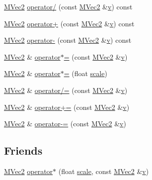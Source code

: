 \begin{CompactItemize}
\item 
\hyperlink{class_m_vec2}{MVec2} \hyperlink{class_m_vec2_a0a8d73a0d2df28d54330b8b8709499b}{operator/} (const \hyperlink{class_m_vec2}{MVec2} \&\hyperlink{glext__bak_8h_5cf89b94f7478c0ebc4429b60e7ef93b}{v}) const 
\item 
\hyperlink{class_m_vec2}{MVec2} \hyperlink{class_m_vec2_bb82987dba0a4e140357d3d04c1f9770}{operator+} (const \hyperlink{class_m_vec2}{MVec2} \&\hyperlink{glext__bak_8h_5cf89b94f7478c0ebc4429b60e7ef93b}{v}) const 
\item 
\hyperlink{class_m_vec2}{MVec2} \hyperlink{class_m_vec2_3ebc8a2ec5fddfb03ae70b8b5eba372e}{operator-} (const \hyperlink{class_m_vec2}{MVec2} \&\hyperlink{glext__bak_8h_5cf89b94f7478c0ebc4429b60e7ef93b}{v}) const 
\item 
\hyperlink{class_m_vec2}{MVec2} \& \hyperlink{class_m_vec2_323651a51ffe6608ba52368916c691c8}{operator$\ast$=} (const \hyperlink{class_m_vec2}{MVec2} \&\hyperlink{glext__bak_8h_5cf89b94f7478c0ebc4429b60e7ef93b}{v})
\item 
\hyperlink{class_m_vec2}{MVec2} \& \hyperlink{class_m_vec2_70d977f70e6f277fd2a918a90f803d0b}{operator$\ast$=} (float \hyperlink{glext__bak_8h_281421b881aa7a1266842b73a3bc7655}{scale})
\item 
\hyperlink{class_m_vec2}{MVec2} \& \hyperlink{class_m_vec2_8d7dfb8881c4acce91b1143471f0abce}{operator/=} (const \hyperlink{class_m_vec2}{MVec2} \&\hyperlink{glext__bak_8h_5cf89b94f7478c0ebc4429b60e7ef93b}{v})
\item 
\hyperlink{class_m_vec2}{MVec2} \& \hyperlink{class_m_vec2_843631a6f52ac62d6e8af05acb26ffc2}{operator+=} (const \hyperlink{class_m_vec2}{MVec2} \&\hyperlink{glext__bak_8h_5cf89b94f7478c0ebc4429b60e7ef93b}{v})
\item 
\hyperlink{class_m_vec2}{MVec2} \& \hyperlink{class_m_vec2_1416f1bb81777c79c96a7b3218c37dfe}{operator-=} (const \hyperlink{class_m_vec2}{MVec2} \&\hyperlink{glext__bak_8h_5cf89b94f7478c0ebc4429b60e7ef93b}{v})
\end{CompactItemize}
\subsection*{Friends}
\begin{CompactItemize}
\item 
\hyperlink{class_m_vec2}{MVec2} \hyperlink{class_m_vec2_ed5cee556a30023d584efef3dd83a306}{operator$\ast$} (float \hyperlink{glext__bak_8h_281421b881aa7a1266842b73a3bc7655}{scale}, const \hyperlink{class_m_vec2}{MVec2} \&\hyperlink{glext__bak_8h_5cf89b94f7478c0ebc4429b60e7ef93b}{v})
\end{CompactItemize}


